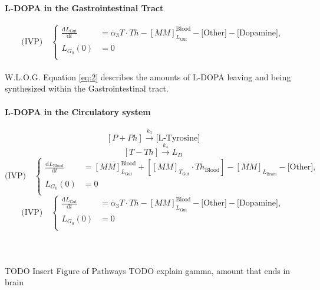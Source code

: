 \documentclass[smallextended]{svjour3}
\newcommand{\od}[3][]{\ensuremath{\frac{\mathrm{d}^{#1} {#2}}{\mathrm{d}{#3}^{#1}}}}
\newcommand{\todo}[1]{{\huge\color{red}TODO {#1}}}
\begin{document}
\paragraph{L-DOPA in the Gastrointestinal Tract}
\begin{equation} 
 \label{eq:2}
 \text{(IVP)}\quad 
  \left\{
   \begin{aligned}
    \od{L_{\text{Gut}}}{t} &= \alpha_3T\cdot Th -[MM]_{L_{\text{Gut}}}^{\text{Blood}} - \text{[Other]} - \text{[Dopamine]}, \\
L_{G_0}(0) &= 0 \\
   \end{aligned}
  \right.
 \end{equation}
\\
 W.L.O.G. Equation \ref{eq:2} describes the amounts of L-DOPA leaving and being synthesized within the Gastrointestinal tract.
\paragraph{L-DOPA in the Circulatory system}
$${[P+Ph]}\overset{k_3}{\longrightarrow}\text{[L-Tyrosine]}$$
$${[T-Th]}\overset{k_4}{\longrightarrow}L_D$$
\begin{equation}
 \label{eq:3}
  \text{(IVP)}\quad 
   \left\{
    \begin{aligned}
     \od{L_{\text{Blood}}}{t} &= [MM]_{L_{\text{Gut}}}^{\text{Blood}} + {[[MM]_{T_{\text{Gut}}} \cdot Th_{\text{Blood}}]}- [MM]_{L_{\text{Brain}}} -\text{[Other]}, \\
L_{G_0}(0) &= 0 \\
    \end{aligned}
   \right.
\end{equation}
\begin{equation}
 \label{eq:4}
 \text{(IVP)}\quad 
  \left\{
    \begin{aligned}
     \od{L_{\text{Gut}}}{t} &= \alpha_3T\cdot Th -[MM]_{L_{\text{Gut}}}^{\text{Blood}} - \text{[Other]} - \text{[Dopamine]}, \\
 L_{G_0}(0) &= 0 \\
    \end{aligned}
  \right.
\end{equation} \\ \\ \\
\todo{Insert Figure of Pathways}
\todo{explain gamma, amount that ends in brain}
%
\end{document}
